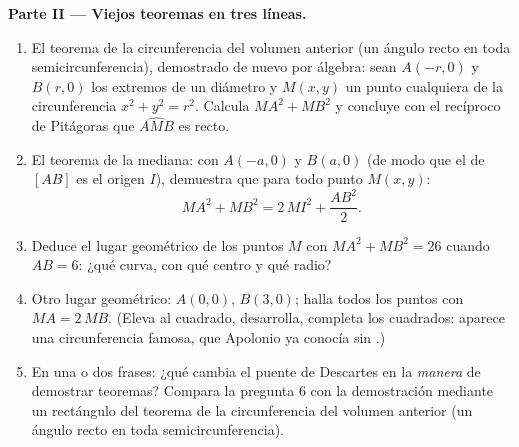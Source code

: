 \begin{problem}
\medskip
\noindent\textbf{Parte II --- Viejos teoremas en tres líneas.}
\begin{enumerate}[resume]
  \item El teorema de la circunferencia del volumen anterior (un ángulo
        recto en toda semicircunferencia), demostrado de nuevo por
        álgebra: sean $A(-r, 0)$ y $B(r, 0)$ los extremos de un diámetro y
        $M(x, y)$ un punto cualquiera de la circunferencia
        $x^2 + y^2 = r^2$. Calcula $MA^2 + MB^2$ y concluye con el
        recíproco de Pitágoras que $\widehat{AMB}$ es recto.
  \item El teorema de la mediana: con $A(-a, 0)$ y $B(a, 0)$ (de modo que
        el  de $[AB]$ es el origen $I$), demuestra que para
        todo punto $M(x, y)$:
        \[
        MA^2 + MB^2 = 2\,MI^2 + \frac{AB^2}{2} .
        \]
  \item Deduce el lugar geométrico de los puntos $M$ con
        $MA^2 + MB^2 = 26$ cuando $AB = 6$: ¿qué curva, con qué centro y
        qué radio?
  \item Otro lugar geométrico: $A(0,0)$, $B(3,0)$; halla todos los puntos
        con $MA = 2\,MB$. (Eleva al cuadrado, desarrolla, completa los
        cuadrados: aparece una circunferencia famosa, que Apolonio ya
        conocía sin .)
  \item En una o dos frases: ¿qué cambia el puente de Descartes en la
        \emph{manera} de demostrar teoremas? Compara la pregunta 6 con la
        demostración mediante un rectángulo del teorema de la
        circunferencia del volumen anterior (un ángulo recto en toda
        semicircunferencia).
\end{enumerate}


\end{problem}
